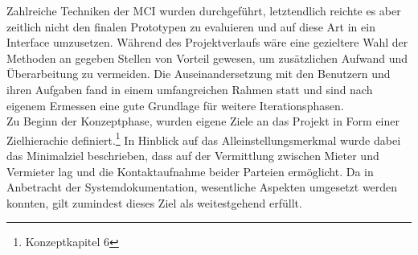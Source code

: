 Zahlreiche Techniken der MCI wurden durchgeführt, letztendlich reichte es aber zeitlich nicht den finalen Prototypen zu evaluieren und auf diese Art in ein Interface umzusetzen. Während des Projektverlaufs wäre eine gezieltere Wahl der Methoden an gegeben Stellen von Vorteil gewesen, um zusätzlichen Aufwand und Überarbeitung zu vermeiden. Die Auseinandersetzung mit den Benutzern und ihren Aufgaben fand in einem umfangreichen Rahmen statt und sind nach eigenem Ermessen eine gute Grundlage für weitere Iterationsphasen.\\

Zu Beginn der Konzeptphase, wurden eigene Ziele an das Projekt in Form einer Zielhierachie definiert.\footnote{Konzeptkapitel 6}
In Hinblick auf das Alleinstellungsmerkmal wurde dabei das Minimalziel beschrieben, dass auf der Vermittlung zwischen Mieter und Vermieter lag und die Kontaktaufnahme beider Parteien ermöglicht. Da in Anbetracht der Systemdokumentation, wesentliche Aspekten umgesetzt werden konnten, gilt zumindest dieses Ziel als weitestgehend erfüllt.